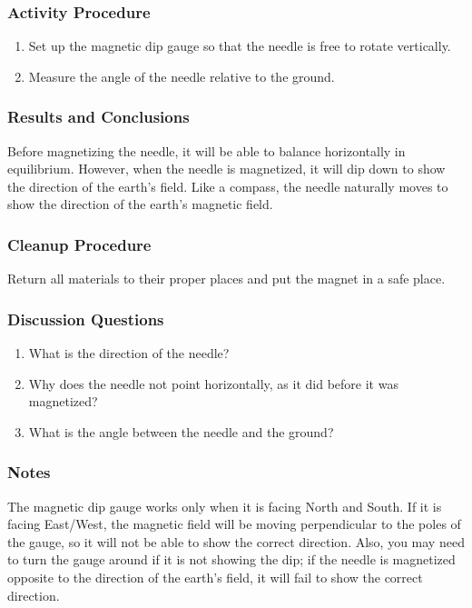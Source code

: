 \subsubsection*{Activity Procedure}
\begin{enumerate}
\item{Set up the magnetic dip gauge so that the needle is free to rotate vertically.}
\item{Measure the angle of the needle relative to the ground.}
\end{enumerate}

\subsubsection*{Results and Conclusions}
Before magnetizing the needle, it will be able to balance horizontally in equilibrium.  However, when the needle is magnetized, it will dip down to show the direction of the earth's field.  Like a compass, the needle naturally moves to show the direction of the earth's magnetic field.

\subsubsection*{Cleanup Procedure}
Return all materials to their proper places and put the magnet in a safe place.

\subsubsection*{Discussion Questions}
\begin{enumerate}
\item{What is the direction of the needle?}
\item{Why does the needle not point horizontally, as it did before it was magnetized?}
\item{What is the angle between the needle and the ground?}
\end{enumerate}

\subsubsection*{Notes}
The magnetic dip gauge works only when it is facing North and South.  If it is facing East/West, the magnetic field will be moving perpendicular to the poles of the gauge, so it will not be able to show the correct direction.  Also, you may need to turn the gauge around if it is not showing the dip; if the needle is magnetized opposite to the direction of the earth's field, it will fail to show the correct direction.
